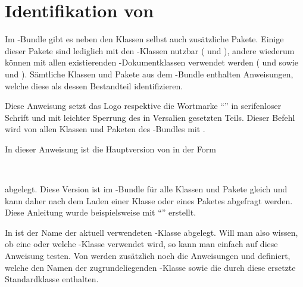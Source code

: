 \chapter{Identifikation von \TUDScript}
Im \TUDScript-Bundle gibt es neben den Klassen selbst auch zusätzliche Pakete. 
Einige dieser Pakete sind lediglich mit den \TUDScript-Klassen nutzbar 
( und ), andere wiederum können 
mit allen existierenden -Dokumentklassen  verwendet werden 
( und  sowie  und 
). Sämtliche Klassen und Pakete aus dem \TUDScript-Bundle 
enthalten Anweisungen, welche diese als dessen Bestandteil identifizieren.

\begin{Declaration}[v2.04]{}
\printdeclarationlist%
%
Diese Anweisung setzt das Logo respektive die Wortmarke \enquote{\TUDScript{}} 
in serifenloser Schrift und mit leichter Sperrung des in Versalien gesetzten 
Teils. Dieser Befehl wird von allen Klassen und Paketen des \TUDScript-Bundles 
mit .
\end{Declaration}

\begin{Declaration}[v2.04]{}
\printdeclarationlist%
%
In dieser Anweisung ist die Hauptversion von \TUDScript in der Form
\begin{quoting}
~~
\end{quoting}
abgelegt. Diese Version ist im \TUDScript-Bundle für alle Klassen und Pakete 
gleich und kann daher nach dem Laden einer Klasse oder eines Paketes abgefragt 
werden. Diese Anleitung wurde beispielsweise mit \enquote{\TUDVersion{}} 
erstellt.
\end{Declaration}

\begin{Declaration}[v2.04]{}
\printdeclarationlist%
%
In  ist der Name der aktuell verwendeten \TUDScript-Klasse 
abgelegt. Will man also wissen, ob eine oder welche \TUDScript-Klasse verwendet 
wird, so kann man einfach auf diese Anweisung testen. Von \KOMAScript werden 
zusätzlich noch die Anweisungen  und  
definiert, welche den Namen der zugrundeliegenden \KOMAScript-Klasse sowie die 
durch diese ersetzte Standardklasse enthalten.
\end{Declaration}
